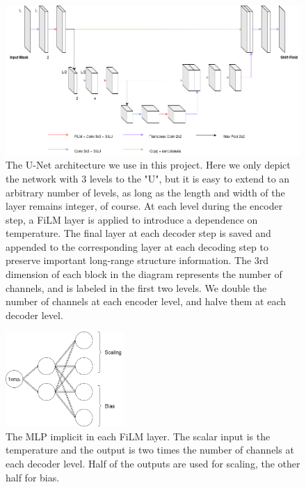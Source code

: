 \documentclass[12pt]{article}
\begin{document}
\begin{figure}
	\begin{center}
	\includegraphics[width=\textwidth]{figures/UNet.png}
	\end{center}
	\caption[U-Net Block Diagram]{The U-Net architecture we use in this project. Here we only depict the network with 3 levels to the "U", but
	it is easy to extend to an arbitrary number of levels, as long as the length and width of the layer remains integer, of course.
	At each level during the encoder step, a FiLM layer is applied to introduce a dependence on temperature. The final layer
	at each decoder step is saved and appended to the corresponding layer at each decoding step to preserve important long-range
	structure information. The 3rd dimension of each block in the diagram represents the number of channels, and is labeled in the first two
	levels. We double the number of channels at each encoder level, and halve them at each decoder level.}
	\label{fig:unet}
\end{figure}

\begin{figure}
	\begin{center}
		\includegraphics[width=0.4\textwidth]{figures/FiLM.png}
	\end{center}
	\caption[Multilayer Perceptron for FiLM]{The MLP implicit in each FiLM layer. The scalar input is the temperature and the output is two times the number of
	channels at each decoder level. Half of the outputs are used for scaling, the other half for bias.}
	\label{fig:film}
\end{figure}
\end{document}
